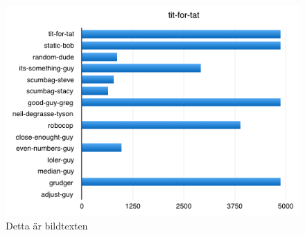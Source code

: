 \begin{figure}[htb]
	\begin{center}
	\includegraphics[scale=0.75, angle=0]{bilder/tit-for-tat.png}
	\caption{Detta är bildtexten}
	\label{tit-for-tat}
	\end{center}
\end{figure}